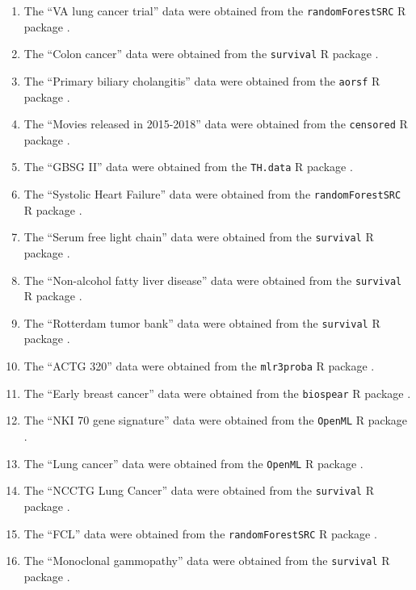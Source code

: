\documentclass[12pt]{article}\usepackage[]{graphicx}\usepackage[]{xcolor}
\begin{document}
\begin{enumerate}

 \item The ``VA lung cancer trial'' data \citep{kalbfleisch2011statistical} were obtained from the \texttt{randomForestSRC} R package \citep{randomForestSRC}. 
 \item The ``Colon cancer'' data \citep{moertel1995fluorouracil} were obtained from the \texttt{survival} R package \citep{survival}. 
 \item The ``Primary biliary cholangitis'' data \citep{therneau2000cox} were obtained from the \texttt{aorsf} R package \citep{aorsf}. 
 \item The ``Movies released in 2015-2018'' data  were obtained from the \texttt{censored} R package \citep{censored}. 
 \item The ``GBSG II'' data \citep{schumacher1994rauschecker} were obtained from the \texttt{TH.data} R package \citep{TH.data}. 
 \item The ``Systolic Heart Failure'' data \citep{hsich2011identifying} were obtained from the \texttt{randomForestSRC} R package \citep{randomForestSRC}. 
 \item The ``Serum free light chain'' data \citep{dispenzieri2012use, kyle2006prevalence} were obtained from the \texttt{survival} R package \citep{survival}. 
 \item The ``Non-alcohol fatty liver disease'' data \citep{allen2018nonalcoholic} were obtained from the \texttt{survival} R package \citep{survival}. 
 \item The ``Rotterdam tumor bank'' data \citep{royston2013external} were obtained from the \texttt{survival} R package \citep{survival}. 
 \item The ``ACTG 320'' data \citep{hosmer2002applied} were obtained from the \texttt{mlr3proba} R package \citep{mlr3proba}. 
 \item The ``Early breast cancer'' data \citep{desmedt2011multifactorial, hatzis2011genomic, ternes2017identification} were obtained from the \texttt{biospear} R package \citep{biospear}. 
 \item The ``NKI 70 gene signature'' data \citep{van2002gene} were obtained from the \texttt{OpenML} R package \citep{OpenML}. 
 \item The ``Lung cancer'' data \citep{director2008gene} were obtained from the \texttt{OpenML} R package \citep{OpenML}. 
 \item The ``NCCTG Lung Cancer'' data \citep{loprinzi1994prospective} were obtained from the \texttt{survival} R package \citep{survival}. 
 \item The ``FCL'' data \citep{pintilie2006competing} were obtained from the \texttt{randomForestSRC} R package \citep{randomForestSRC}. 
 \item The ``Monoclonal gammopathy'' data \citep{kyle2002long} were obtained from the \texttt{survival} R package \citep{survival}.

\end{enumerate}
\end{document}
